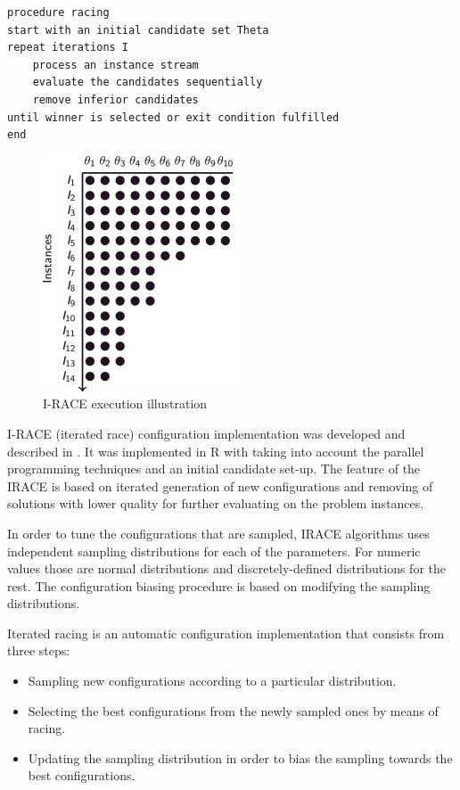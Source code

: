\documentclass[12pt]{article}
\begin{document}
\begin{minipage}[c, breaklines=true]{0.95\textwidth}
\begin{lstlisting}[caption={General racing pseudo-code}, label={lst:racing}]
procedure racing
start with an initial candidate set Theta
repeat iterations I
	process an instance stream
	evaluate the candidates sequentially
	remove inferior candidates
until winner is selected or exit condition fulfilled
end
\end{lstlisting}
\end{minipage}

\begin{figure}[H]
  \centering
    \includegraphics[scale=1.2]{irace.jpg}
  \caption{I-RACE execution illustration}
  \label{fig:irace}
\end{figure}


I-RACE (iterated race) configuration implementation was developed and described in \cite{iraceaac}. It was implemented in R with taking into account the parallel programming techniques and an initial candidate set-up. The feature of the IRACE is based on iterated generation of new configurations and removing of solutions with lower quality for further evaluating on the problem instances.

In order to tune the configurations that are sampled, IRACE algorithms uses independent sampling distributions for each of the parameters. For numeric values those are normal distributions and discretely-defined distributions for the rest. The configuration biasing procedure is based on modifying the sampling distributions.

Iterated racing is an automatic configuration implementation that consists from three steps:

\begin{itemize}
\item Sampling new configurations according to a particular distribution.
\item Selecting the best configurations from the newly sampled ones by means of racing.
\item Updating the sampling distribution in order to bias the sampling towards the best configurations.
\end{itemize}
\end{document}
